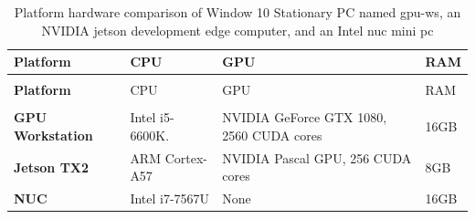 \begin{minipage}[t]{\linewidth}
	\begin{longtabu}{>{\bfseries}X[0.8]|X[0.8]|X[1.5]|X[r0.3]}
		\caption[Platform hardware comparison]{Platform hardware comparison of Window 10 Stationary PC named \gls{gpu-ws}, an NVIDIA \gls{jetson} development edge computer, and an Intel \gls{nuc} mini pc} \label{tbl:platforms} \\
		\toprule
		\rowfont{\bfseries}
		Platform & CPU & GPU & RAM  \tabularnewline
		\bottomrule
		\endfirsthead
		\\
		\toprule
		\rowfont{\bfseries}
		Platform & CPU & GPU & RAM  \tabularnewline
		\bottomrule
		\endhead %
		\bottomrule
		\\
		\endfoot
		\hline
		\endlastfoot
		GPU Workstation	& Intel i5-6600K.	& NVIDIA GeForce GTX 1080, 2560 CUDA cores	& 16GB \tabularnewline
		\hline
		Jetson TX2	& ARM Cortex-A57 	& NVIDIA Pascal GPU, 256 CUDA cores 		& 8GB \tabularnewline
		\hline
		NUC		  	& Intel i7-7567U	& None										& 16GB \tabularnewline									
		\bottomrule
	\end{longtabu}
\end{minipage}

